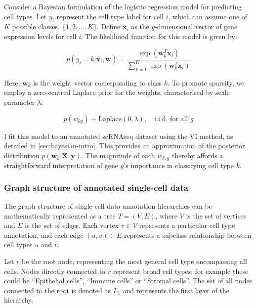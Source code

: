 Consider a Bayesian formulation of the logistic regression model for predicting cell types. Let $y_i$ represent the cell type label for cell $i$, which can assume one of $K$ possible classes, $\{1, 2, \ldots, K\}$. Define $\mathbf{x}_i$ as the $g$-dimensional vector of gene expression levels for cell $i$. The likelihood function for this model is given by:

\begin{equation}
    \label{eq:logistic-regression-likelihood}
    p(y_i = k | \mathbf{x}_i, \mathbf{w}) = \frac{\exp(\mathbf{w}_{k}^T \mathbf{x}_i)}{\sum_{k=1}^{K} \exp(\mathbf{w}_{k}^T \mathbf{x}_i)}
\end{equation}

Here, $\mathbf{w}_k$ is the weight vector corresponding to class $k$. To promote sparsity, we employ a zero-centred Laplace prior for the weights, characterised by scale parameter $\lambda$:

\begin{equation}
    \label{eq:logistic-regression-prior}
    p(w_{kg}) \sim \text{Laplace}(0, \lambda),\quad\text{i.i.d. for all } g 
\end{equation}

I fit this model to an annotated \ac{scRNAseq} dataset using the \ac{VI} method, as detailed in \cref{sec:bayesian-intro}. This provides an approximation of the posterior distribution $p(\mathbf{w}_k | \mathbf{X}, \mathbf{y})$. The magnitude of each $w_{k,g}$ thereby affords a straightforward interpretation of gene $g$'s importance in classifying cell type $k$.

\subsubsection*{Graph structure of annotated single-cell data}

The graph structure of single-cell data annotation hierarchies can be mathematically represented as a tree $T = (V, E)$, where $V$ is the set of vertices and $E$ is the set of edges. Each vertex $v \in V$ represents a particular cell type annotation, and each edge $(u, v) \in E$ represents a subclass relationship between cell types $u$ and $v$. 

Let $r$ be the root node, representing the most general cell type encompassing all cells. Nodes directly connected to $r$ represent broad cell types; for example these could be ``Epithelial cells'', ``Immune cells'' or ``Stromal cells''. The set of all nodes connected to the root is denoted as $L_1$ and represents the first layer of the hierarchy. 

